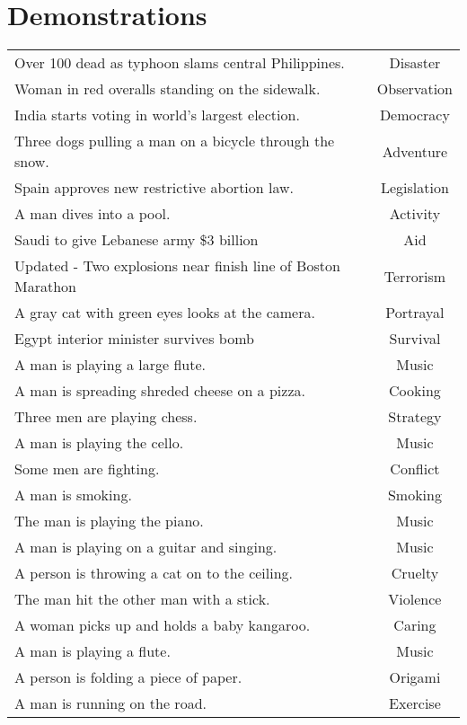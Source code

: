 
%

\section{Demonstrations}
\label{apx:demo}

\begin{longtable}{p{12cm}c}
Over 100 dead as typhoon slams central Philippines. & Disaster\\
Woman in red overalls standing on the sidewalk. & Observation\\
India starts voting in world's largest election. & Democracy\\
Three dogs pulling a man on a bicycle through the snow. & Adventure\\
Spain approves new restrictive abortion law. & Legislation\\
A man dives into a pool. & Activity\\
Saudi to give Lebanese army \$3 billion & Aid\\
Updated - Two explosions near finish line of Boston Marathon & Terrorism\\
A gray cat with green eyes looks at the camera. & Portrayal\\
Egypt interior minister survives bomb & Survival\\
A man is playing a large flute. & Music\\
A man is spreading shreded cheese on a pizza. & Cooking\\
Three men are playing chess. & Strategy\\
A man is playing the cello. & Music\\
Some men are fighting. & Conflict\\
A man is smoking. & Smoking\\
The man is playing the piano. & Music\\
A man is playing on a guitar and singing. & Music\\
A person is throwing a cat on to the ceiling. & Cruelty\\
The man hit the other man with a stick. & Violence\\
A woman picks up and holds a baby kangaroo. & Caring\\
A man is playing a flute. & Music\\
A person is folding a piece of paper. & Origami\\
A man is running on the road. & Exercise\\

\end{longtable}
